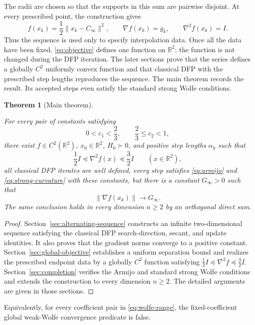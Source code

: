 \documentclass[11pt]{article}
\newtheorem{theorem}{Theorem}
\newcommand{\R}{\mathbb R}
\begin{document}
The radii are chosen so that the supports in this sum are pairwise disjoint.
At every prescribed point, the construction gives
\[
f(x_k)=\frac12\|x_k-C_\infty\|^2,\qquad
\nabla f(x_k)=g_k,\qquad
\nabla^2f(x_k)=I.
\]
Thus the sequence is used only to specify interpolation data.  Once all the
data have been fixed, \eqref{eq:objective} defines one function on $\R^2$;
the function is not changed during the DFP iteration.  The later sections
prove that the series defines a globally $C^2$ uniformly convex function and
that classical DFP with the prescribed step lengths reproduces the sequence.
The main theorem records the result.  Its accepted steps even satisfy the
standard strong Wolfe conditions.

\begin{theorem}[Main theorem]\label{thm:main}



For every pair of constants satisfying
\begin{equation}\label{eq:wolfe-range}
0<c_1<\frac23,\qquad \frac23\le c_2<1,
\end{equation}
there exist $f\in C^2(\R^2)$, $x_0\in\R^2$, $H_0\succ0$, and positive step
lengths $\alpha_k$ such that
\[
\frac12I\preceq\nabla^2f(x)\preceq\frac32I
\qquad(x\in\R^2),
\]
all classical DFP iterates are well defined, every step satisfies
\eqref{eq:armijo} and \eqref{eq:strong-curvature} with these constants, but
there is a constant $G_\infty>0$ such that
\[
\|\nabla f(x_k)\|\longrightarrow G_\infty.
\]
The same conclusion holds in every dimension $n\ge2$ by an orthogonal direct
sum.
\end{theorem}

\begin{proof}
Section~\ref{sec:alternating-sequence} constructs an infinite
two-dimensional sequence satisfying the classical DFP search-direction, secant, and update identities.  It also proves that the gradient norms converge to a positive constant.  Section~\ref{sec:global-objective} establishes a uniform separation bound and realizes the prescribed endpoint
data by a globally $C^2$ function satisfying
$\frac12 I\preceq\nabla^2 f\preceq\frac32 I$.
Section~\ref{sec:completion} verifies the Armijo and standard strong Wolfe conditions and extends the construction to every dimension $n\ge2$.
The detailed arguments are given in those sections.
\end{proof}

Equivalently, for every coefficient pair in \eqref{eq:wolfe-range}, the
fixed-coefficient global weak-Wolfe convergence predicate is false.
\end{document}
